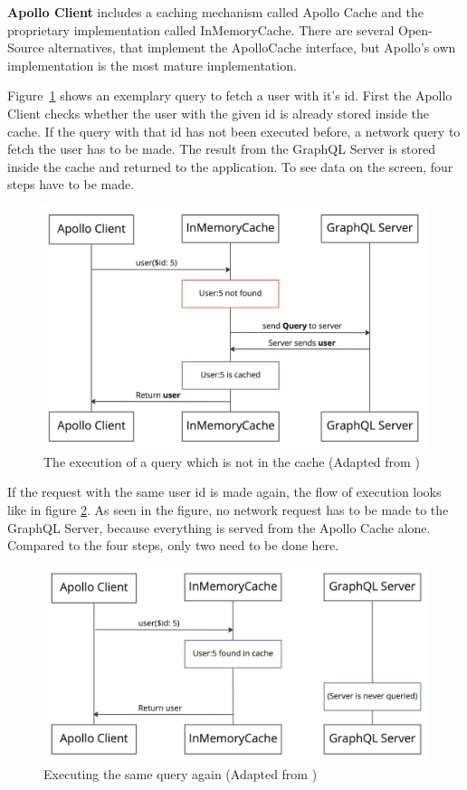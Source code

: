 \textbf{Apollo Client} includes a caching mechanism called Apollo Cache and the proprietary implementation called InMemoryCache. There are several Open-Source alternatives, that implement the ApolloCache interface, but Apollo's own implementation is the most mature implementation.

Figure~\ref{figure:background:graphql:user-query-first-time} shows an exemplary query to fetch a user with it's id. First the Apollo Client checks whether the user with the given id is already stored inside the cache. If the query with that id has not been executed before, a network query to fetch the user has to be made. The result from the GraphQL Server is stored inside the cache and returned to the application. To see data on the screen, four steps have to be made. \cite{misc:-:background:graphql:apollo-client-cache-overview}

\ifshowImages
  \begin{figure}[H]
  \centering
  \includegraphics[width=0.6\linewidth]{images/background/apollo/apollo-client-basic-cache.jpeg}
  \caption{The execution of a query which is not in the cache (Adapted from \cite{misc:-:background:graphql:apollo-client-cache-overview})}\label{figure:background:graphql:user-query-first-time}
  \end{figure}
\fi

If the request with the same user id is made again, the flow of execution looks like in figure \ref{figure:background:graphql:user-query-second-time}. As seen in the figure, no network request has to be made to the GraphQL Server, because everything is served from the Apollo Cache alone. Compared to the four steps, only two need to be done here. \cite{misc:-:background:graphql:apollo-client-cache-overview}

\ifshowImages
  \begin{figure}[H]
  \centering
  \includegraphics[width=0.6\linewidth]{images/background/apollo/apollo-client-basic-cache-warm.jpeg}
  \caption{Executing the same query again (Adapted from \cite{misc:-:background:graphql:apollo-client-cache-overview})}\label{figure:background:graphql:user-query-second-time}
  \end{figure}
\fi

